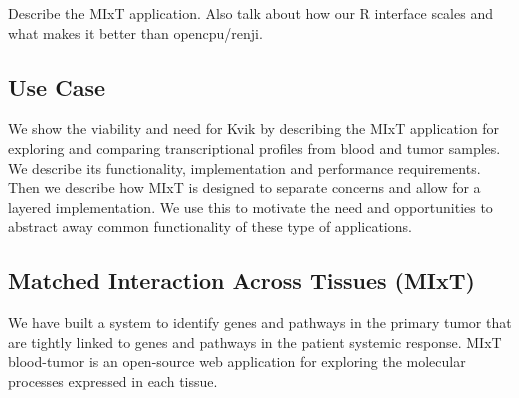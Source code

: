 
Describe the MIxT application. Also talk about how our R interface scales and
what makes it better than opencpu/renji.

%
%

\subsection*{Use Case}


We show the viability and need for Kvik by describing the MIxT application for
exploring and comparing transcriptional profiles from blood and tumor samples.
We describe its functionality, implementation 
and performance requirements.
Then we describe how MIxT
is designed to separate concerns and allow for a layered implementation. We use
this to motivate the need and opportunities to abstract away common
functionality of these type of applications.

\subsection*{Matched Interaction Across Tissues (MIxT)}
We have built a system to identify genes and pathways in the primary tumor that
are tightly linked to genes and pathways in the patient systemic
response\cite{dumeaux2017}. MIxT blood-tumor is an open-source web application
for exploring the molecular processes expressed in each tissue. 

